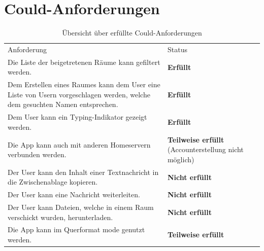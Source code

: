    \section{Could-Anforderungen}\label{sec:could-anforderungen}
    \begin{table}[h]
        \centering
        \begin{tabular}{p{}|p{}}
            Anforderung & Status\\
            \cline{1-2}
            Die Liste der beigetretenen Räume kann gefiltert werden. &  \textbf{Erfüllt} \\
            \cline{1-2}
            Dem Erstellen eines Raumes kann dem User eine Liste von Usern vorgeschlagen werden, welche dem gesuchten Namen entsprechen. & \textbf{Erfüllt}  \\
            \cline{1-2}
            Dem User kann ein Typing-Indikator gezeigt werden. &  \textbf{Erfüllt} \\
            \cline{1-2}
            Die App kann auch mit anderen Homeservern verbunden werden. & \textbf{Teilweise erfüllt} (Accounterstellung nicht möglich)\\
            \cline{1-2}
            Der User kann den Inhalt einer Textnachricht in die Zwischenablage kopieren. & \textbf{Nicht erfüllt} \\
            \cline{1-2}
            Der User kann eine Nachricht weiterleiten. & \textbf{Nicht erfüllt}  \\
            \cline{1-2}
            Der User kann Dateien, welche in einem Raum verschickt wurden, herunterladen. & \textbf{Nicht erfüllt}  \\
            \cline{1-2}
            Die App kann im Querformat mode genutzt werden. & \textbf{Teilweise erfüllt}
        \end{tabular}
        \caption{Übersicht über erfüllte Could-Anforderungen}
        \label{tab:erfüllte-could-anforderungen}
    \end{table}


